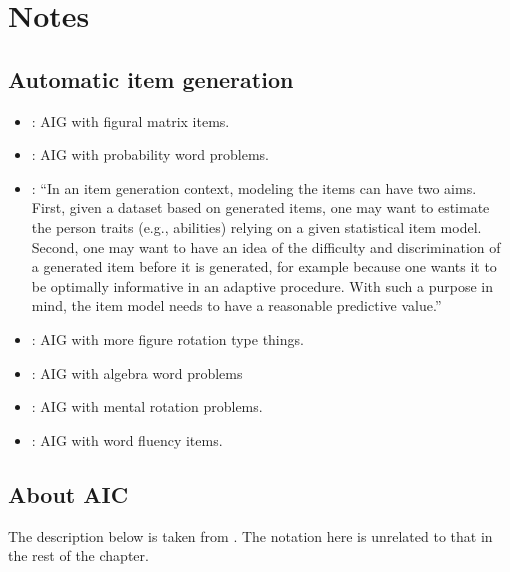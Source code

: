 \section{Notes}

\subsection{Automatic item generation}

	\begin{itemize}
		\item \textcite{freund2008explaining}: AIG with figural matrix items.
		\item \textcite{holling2009automatic}: AIG with probability word problems.
		\item \textcite{cho2014additive}: ``In an item generation context, modeling the items can have two aims. First, given a dataset based on generated items, one may want to estimate the person traits (e.g., abilities) relying on a given statistical item model. Second, one may want to have an idea of the difficulty and discrimination of a generated item before it is generated, for example because one wants it to be optimally informative in an adaptive procedure. With such a purpose in mind, the item model needs to have a reasonable predictive value.''
		\item \textcite{arendasy2005automatic}: AIG with more figure rotation type things.
		\item \textcite{arendasy2007using}: AIG with algebra word problems
		\item \textcite{arendasy2010evaluating}: AIG with mental rotation problems.
		\item \textcite{arendasy2011using}: AIG with word fluency items.
	\end{itemize}

\subsection{About AIC}

The description below is taken from \textcite{burnham2003model}. The notation here is unrelated to that in the rest of the chapter.

